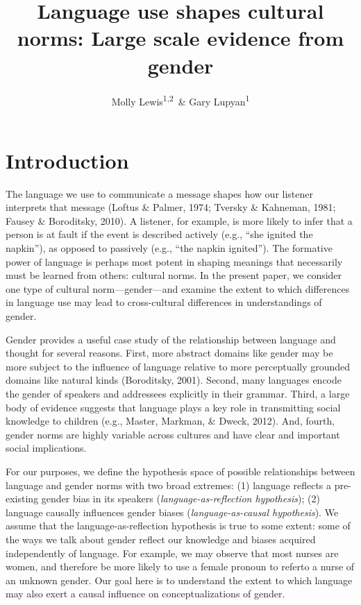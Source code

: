 \documentclass[man]{apa6}
\title{Language use shapes cultural norms: Large scale evidence from gender}
\author{Molly Lewis\textsuperscript{1,2}~\& Gary Lupyan\textsuperscript{1}}
\date{}
\affiliation{
\vspace{0.5cm}
\textsuperscript{1} University of Wisconsin-Madison\\\textsuperscript{2} University of Chicago}
\theoremstyle{definition}
\theoremstyle{definition}
\theoremstyle{definition}
\theoremstyle{remark}
\begin{document}
\maketitle

\section{Introduction}\label{introduction}

The language we use to communicate a message shapes how our listener
interprets that message (Loftus \& Palmer, 1974; Tversky \& Kahneman,
1981; Fausey \& Boroditsky, 2010). A listener, for example, is more
likely to infer that a person is at fault if the event is described
actively (e.g., \enquote{she ignited the napkin}), as opposed to
passively (e.g., \enquote{the napkin ignited}). The formative power of
language is perhaps most potent in shaping meanings that necessarily
must be learned from others: cultural norms. In the present paper, we
consider one type of cultural norm---gender---and examine the extent to
which differences in language use may lead to cross-cultural differences
in understandings of gender.

Gender provides a useful case study of the relationship between language
and thought for several reasons. First, more abstract domains like
gender may be more subject to the influence of language relative to more
perceptually grounded domains like natural kinds (Boroditsky, 2001).
Second, many languages encode the gender of speakers and addressees
explicitly in their grammar. Third, a large body of evidence suggests
that language plays a key role in transmitting social knowledge to
children (e.g., Master, Markman, \& Dweck, 2012). And, fourth, gender
norms are highly variable across cultures and have clear and important
social implications.

For our purposes, we define the hypothesis space of possible
relationships between language and gender norms with two broad extremes:
(1) language reflects a pre-existing gender bias in its speakers
(\emph{language-as-reflection hypothesis}); (2) language causally
influences gender biases (\emph{language-as-causal hypothesis}). We
assume that the language-as-reflection hypothesis is true to some
extent: some of the ways we talk about gender reflect our knowledge and
biases acquired independently of language. For example, we may observe
that most nurses are women, and therefore be more likely to use a female
pronoun to referto a nurse of an unknown gender. Our goal here is to
understand the extent to which language may also exert a causal
influence on conceptualizations of gender.
\end{document}
